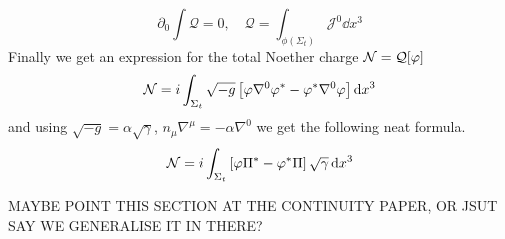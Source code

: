 \begin{equation} \partial_0 \int \mathcal{Q}=0, \quad \mathcal{Q} = \int_{\phi(\Sigma_t)}\mathcal{J}^0 \dd x^3 \end{equation}
Finally we get an expression for the total Noether charge $\mathcal{N} = \mathcal{Q}[\varphi]$
\begin{equation}\mathcal{N} =i \int_{\Sigma_t} \sqrt{-g}\left[ \varphi \nabla^0 \varphi^* - \varphi^*\nabla^0 \varphi\right] \mathrm{d} x^3\end{equation}
and using $\sqrt{-g} = \alpha \sqrt{\gamma}$, $n_\mu \nabla^\mu = -\alpha \nabla^0$ we get the following neat formula.
\begin{equation} \mathcal{N} = i\int_{\Sigma_t}\left[ \varphi \Pi^*-\varphi^*\Pi\right] \sqrt{\gamma}\,\mathrm{d} x^3\end{equation}

MAYBE POINT THIS SECTION AT THE CONTINUITY PAPER, OR JSUT SAY WE GENERALISE IT IN THERE?

